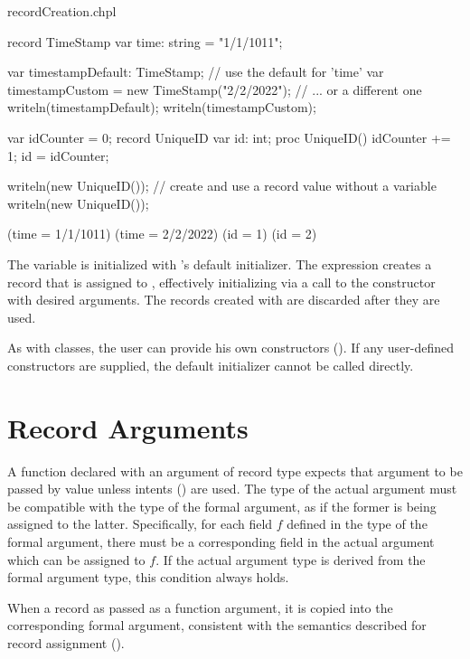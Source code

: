 \begin{chapelexample}{recordCreation.chpl}
\begin{chapel}
record TimeStamp {
  var time: string = "1/1/1011";
}

var timestampDefault: TimeStamp;                  // use the default for 'time'
var timestampCustom = new TimeStamp("2/2/2022");  // ... or a different one
writeln(timestampDefault);
writeln(timestampCustom);

var idCounter = 0;
record UniqueID {
  var id: int;
  proc UniqueID() { idCounter += 1; id = idCounter; }
}

writeln(new UniqueID());  // create and use a record value without a variable
writeln(new UniqueID());
\end{chapel}
\begin{chapeloutput}
(time = 1/1/1011)
(time = 2/2/2022)
(id = 1)
(id = 2)
\end{chapeloutput}
The variable  is initialized with 's
default initializer. The  expression creates a record that is assigned to , effectively initializing  via a call to the constructor with desired arguments. The records created with  are discarded after they are used.
\end{chapelexample}

As with classes, the user can provide his own constructors
().  If any user-defined constructors are
supplied, the default initializer cannot be called directly.  

\section{Record Arguments}
\label{Record_Arguments}

A function declared with an argument of record type expects that argument to be
passed by value unless intents () are used.  The type of the
actual argument must be compatible with the type of the formal argument, as if
the former is being assigned to the latter.  Specifically, for each field $f$
defined in the type of the formal argument, there must be a corresponding field
in the actual argument which can be assigned to $f$.  If the actual argument
type is derived from the formal argument type, this condition always holds.

When a record as passed as a function argument, it is copied into
the corresponding formal argument, consistent with the semantics described for
record assignment ().

